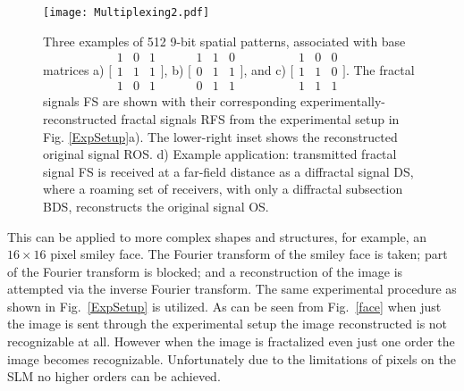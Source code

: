 \begin{figure}[t!]
\texttt{[image: Multiplexing2.pdf]}
\caption[]{Three examples of 512 9-bit spatial patterns, associated with base matrices 
a) $\Big[\begin{smallmatrix} 1 & 0 & 1\\ 1 & 1 & 1\\ 1 & 0 & 1 \end{smallmatrix}\Big]$, b) $\Big[\begin{smallmatrix} 1 & 1 & 0 \\ 0 & 1 & 1\\ 0 & 1 & 1\end{smallmatrix}\Big]$, and c) $\Big[\begin{smallmatrix} 1 & 0 & 0 \\ 1 & 1 & 0\\ 1 & 1 & 1\end{smallmatrix}\Big]$. The fractal signals FS are shown with their corresponding experimentally-reconstructed fractal signals RFS from the experimental setup in Fig. \ref{ExpSetup}a).  The lower-right inset shows the reconstructed original signal ROS. d) Example application: transmitted fractal signal FS is received at a far-field distance as a diffractal signal DS, where a roaming set of receivers, with only a diffractal subsection BDS, reconstructs the original signal OS.}
\label{Multiplex}
\end{figure}
This can be applied to more complex shapes and structures, for example, an $16\times 16$ pixel smiley face. The Fourier transform of the smiley face is taken; part of the Fourier transform is blocked; and a reconstruction of the image is attempted via the inverse Fourier transform. The same experimental procedure as shown in Fig.~\ref{ExpSetup} is utilized. As can be seen from Fig.~\ref{face} when just the image is sent through the experimental setup the image reconstructed is not recognizable at all. However when the image is fractalized even just one order the image becomes recognizable. Unfortunately due to the limitations of pixels on the SLM no higher orders can be achieved.\\
